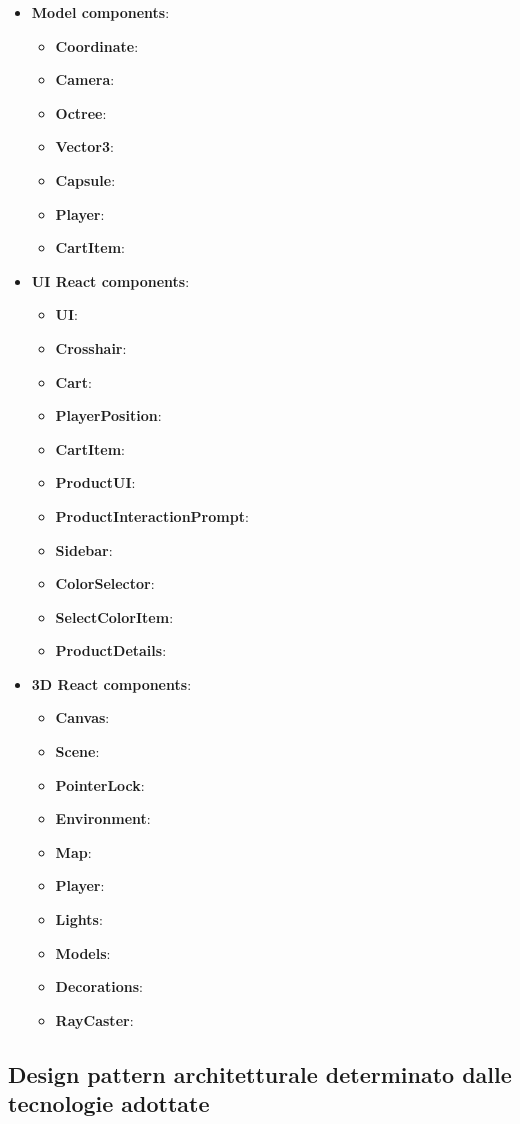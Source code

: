 \begin{itemize}
		\item \textbf{\large Model components}:
		\begin{itemize}
			\item \textbf{Coordinate}:
			\item \textbf{Camera}:
			\item \textbf{Octree}:
			\item \textbf{Vector3}:
			\item \textbf{Capsule}:
			\item \textbf{Player}:
			\item \textbf{CartItem}:
		\end{itemize}
		\item \textbf{\large UI React components}:
		\begin{itemize}
			\item \textbf{UI}:
			\item \textbf{Crosshair}:
			\item \textbf{Cart}:
			\item \textbf{PlayerPosition}:
			\item \textbf{CartItem}:
			\item \textbf{ProductUI}:
			\item \textbf{ProductInteractionPrompt}:
			\item \textbf{Sidebar}:
			\item \textbf{ColorSelector}:
			\item \textbf{SelectColorItem}:
			\item \textbf{ProductDetails}:
		\end{itemize}
		\item \textbf{\large 3D React components}:
		\begin{itemize}
			\item \textbf{Canvas}:
			\item \textbf{Scene}:
			\item \textbf{PointerLock}:
			\item \textbf{Environment}:
			\item \textbf{Map}:
			\item \textbf{Player}:
			\item \textbf{Lights}:
			\item \textbf{Models}:
			\item \textbf{Decorations}:
			\item \textbf{RayCaster}:
		\end{itemize}
\end{itemize}
\subsection{Design pattern architetturale determinato dalle tecnologie adottate}
\label{design Redux}

